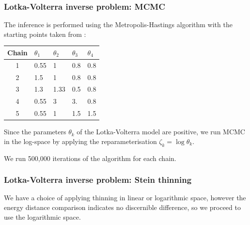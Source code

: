 \documentclass{beamer}
\begin{document}
\begin{frame}
\frametitle{Lotka-Volterra inverse problem: MCMC}

The inference is performed using the Metropolis-Hastings algorithm with the starting points taken from \cite{riabizOptimalThinningMCMC2022}:

\begin{table}[H]
\centering
\begin{tabularx}{0.5\textwidth}{c Y Y Y Y} 
 \hline
 Chain & $\theta_1$ & $\theta_2$ & $\theta_3$ & $\theta_4$ \\
  & 0.55 & 1    & 0.8 & 0.8 \\ 
 2 & 1.5  & 1    & 0.8 & 0.8 \\
 3 & 1.3  & 1.33 & 0.5 & 0.8 \\
 4 & 0.55 & 3    & 3.  & 0.8 \\
 5 & 0.55 & 1    & 1.5 & 1.5 \\
 \hline
\end{tabularx}
\end{table}

Since the parameters $\theta_k$ of the Lotka-Volterra model are positive, we run MCMC in the log-space by applying the reparameterisation $\zeta_k = \log \theta_k$. 

We run 500,000 iterations of the algorithm for each chain.

\end{frame}



\begin{frame}
\frametitle{Lotka-Volterra inverse problem: Stein thinning}

We have a choice of applying thinning in linear or logarithmic space, however the energy distance comparison indicates no discernible difference, so we proceed to use the logarithmic space.

\begin{figure}[h]
\centering
{}
\end{figure}

\end{frame}
\end{document}
